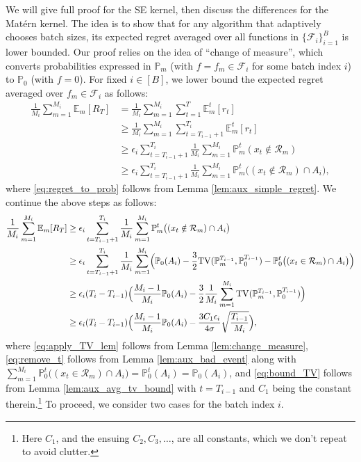 \documentclass[10pt]{article}
\begin{document}
We will give full proof for the SE kernel, then discuss the differences for the Mat\'ern kernel.
The idea is to show that for any algorithm that adaptively chooses batch sizes, its expected regret averaged over all functions in $\{\mathcal{F}_{i}\}_{i=1}^B$ is lower bounded. Our proof relies on the idea of ``change of measure'', which converts probabilities expressed in $\mathbb{P}_m$ (with $f=f_m\in \mathcal{F}_i$ for some batch index $i$) to $\mathbb{P}_0$ (with $f=0$).
For fixed $i\in[B]$, we lower bound the expected regret averaged over $f_{m} \in \mathcal{F}_{i}$ as follows:
\begin{align}
    \frac{1}{M_i}\sum_{m=1}^{M_i}\mathbb{E}_m[R_T]
    & = \frac{1}{M_i}\sum_{m=1}^{M_i}\sum_{t=1}^{T}\mathbb{E}_m^t[r_t] \\
    & \geq \frac{1}{M_i}\sum_{m=1}^{M_i}\sum_{t=T_{i-1}+1}^{T_i}\mathbb{E}_m^t[r_t] \\
    & \geq \epsilon_i\sum_{t=T_{i-1}+1}^{T_i} \frac{1}{M_i}\sum_{m=1}^{M_i} \mathbb{P}_m^t(x_t \notin \mathcal{R}_m) \label{eq:regret_to_prob} \\
    & \geq \epsilon_i\sum_{t=T_{i-1}+1}^{T_i} \frac{1}{M_i}\sum_{m=1}^{M_i} \mathbb{P}_m^t\bigl((x_t \notin \mathcal{R}_m) \cap A_i\bigr), \label{eq:to_bound}
\end{align}
where \eqref{eq:regret_to_prob} follows from Lemma \ref{lem:aux_simple_regret}.  We continue the above steps as follows:
\begin{align}
    \frac{1}{M_i}\sum_{m=1}^{M_i}\mathbb{E}_m[R_T]
    & \geq  \epsilon_i\sum_{t=T_{i-1}+1}^{T_i} \frac{1}{M_i}\sum_{m=1}^{M_i} \mathbb{P}_m^t\bigl((x_t \notin \mathcal{R}_m) \cap A_i\bigr) \\
    & \geq \epsilon_i\sum_{t=T_{i-1}+1}^{T_i} \frac{1}{M_i}\sum_{m=1}^{M_i} \Bigl(\mathbb{P}_0(A_i) - \frac{3}{2} \mathrm{TV}(\mathbb{P}_m^{T_{i-1}}, \mathbb{P}_0^{T_{i-1}}) - \mathbb{P}_0^t \bigl((x_t \in \mathcal{R}_m )\cap A_i\bigr)\Bigr) \label{eq:apply_TV_lem} \\
    & \geq \epsilon_i(T_i-T_{i-1}) \Bigl(\frac{M_i-1}{M_i}\mathbb{P}_0(A_i) - \frac{3}{2} \frac{1}{M_i}\sum_{m=1}^{M_i}\mathrm{TV}(\mathbb{P}_m^{T_{i-1}}, \mathbb{P}_0^{T_{i-1}})\Bigr) \label{eq:remove_t} \\
    & \geq \epsilon_i (T_i-T_{i-1}) \Bigl( \frac{M_i-1}{M_i} \mathbb{P}_0(A_i) - \frac{3C_1\epsilon_i}{4\sigma}\sqrt{\frac{T_{i-1}}{M_i}}\Bigr) \label{eq:bound_TV},
\end{align}
where \eqref{eq:apply_TV_lem} follows from Lemma \ref{lem:change_measure}, \eqref{eq:remove_t} follows from Lemma \ref{lem:aux_bad_event} along with $\sum_{m=1}^{M_i} \mathbb{P}_0^t \bigl((x_t \in \mathcal{R}_m )\cap A_i\bigr) = \mathbb{P}_0^t(A_i) = \mathbb{P}_0(A_i)$, and \eqref{eq:bound_TV} follows from Lemma \ref{lem:aux_avg_tv_bound} with $t = T_{i-1}$ and $C_1$ being the constant therein.\footnote{Here $C_{1}$, and the ensuing $C_{2}, C_{3}, \ldots$, are all constants, which we don't repeat to avoid clutter.} To proceed, we consider two cases for the batch index $i$.
\end{document}
